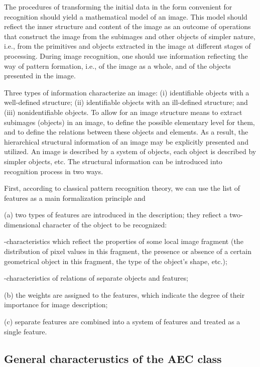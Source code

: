 The procedures of transforming the initial data in the form 
convenient for recognition should yield a mathematical model of an image. 
This model should refiect the inner structure and content of the image as an 
outcome of operations that construct the image from the subimages and other 
objects of simpler nature, i.e., from the primitives and objects extracted in the 
image at different stages of processing. During image recognition, one should use 
information refiecting the way of pattern formation, i.e., of the image as a whole, 
and of the objects presented in the image.  

Three types of information characterize an image: (i) identifiable objects with a 
well-defined structure; (ii) identifiable objects with an ill-defined structure; 
and (iii) nonidentifiable objects. To allow for an image structure means to extract 
subimages (objects) in an image, to define the possible elementary level for them, 
and to define the relations between these objects and elements. As a result, 
the hierarchical structural information of an image may be explicitly presented and 
utilized. An image is described by a system of objects, each object is described by 
simpler objects, etc. The structural information can be introduced into recognition 
process in two ways. 

First, according to classical pattern recognition theory, 
we can use the list of features as a main formalization principle and 

(a) two types of features are introduced in the description;
they refiect a two-dimensional character of the object to be recognized: 

-characteristics which refiect the properties of some local image fragment 
(the distribution of pixel values in this fragment, the presence or 
absence of a certain geometrical object in this fragment, the type of 
the object's shape, etc.); 

-characteristics of relations of separate objects and features; 

(b) the weights are assigned to the features, which indicate the degree 
of their importance for image description; 

(c) separate features are combined into a system of features and treated 
as a single feature. 

\subsection{General characterustics of the AEC class}

